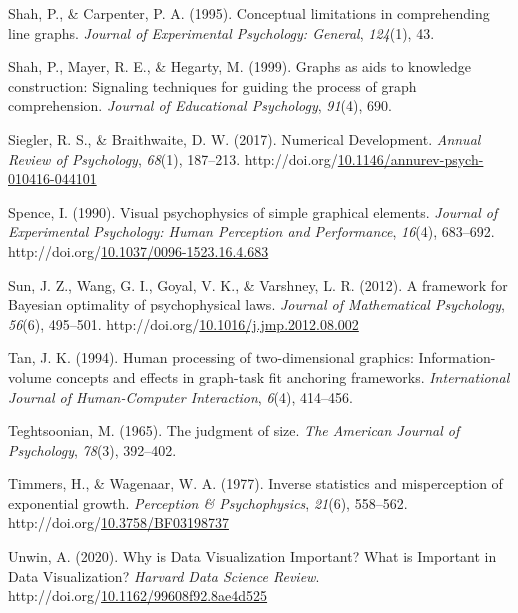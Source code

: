 \documentclass[print]{nuthesis}
\newlength{\cslhangindent}
\newenvironment{CSLReferences}%
{\setlength{\parindent}{0pt}%
\everypar{\setlength{\hangindent}{\cslhangindent}}\ignorespaces}%
{\par}
\begin{document}
\begin{CSLReferences}{1}{0}
\leavevmode\hypertarget{ref-shah1995conceptual}{}%
Shah, P., \& Carpenter, P. A. (1995). Conceptual limitations in comprehending line graphs. \emph{Journal of Experimental Psychology: General}, \emph{124}(1), 43.

\leavevmode\hypertarget{ref-shah1999graphs}{}%
Shah, P., Mayer, R. E., \& Hegarty, M. (1999). Graphs as aids to knowledge construction: Signaling techniques for guiding the process of graph comprehension. \emph{Journal of Educational Psychology}, \emph{91}(4), 690.

\leavevmode\hypertarget{ref-siegler_numerical_2017}{}%
Siegler, R. S., \& Braithwaite, D. W. (2017). Numerical {Development}. \emph{Annual Review of Psychology}, \emph{68}(1), 187--213. http://doi.org/\href{https://doi.org/10.1146/annurev-psych-010416-044101}{10.1146/annurev-psych-010416-044101}

\leavevmode\hypertarget{ref-spence_visual_1990}{}%
Spence, I. (1990). Visual psychophysics of simple graphical elements. \emph{Journal of Experimental Psychology: Human Perception and Performance}, \emph{16}(4), 683--692. http://doi.org/\href{https://doi.org/10.1037/0096-1523.16.4.683}{10.1037/0096-1523.16.4.683}

\leavevmode\hypertarget{ref-sun_framework_2012}{}%
Sun, J. Z., Wang, G. I., Goyal, V. K., \& Varshney, L. R. (2012). A framework for {Bayesian} optimality of psychophysical laws. \emph{Journal of Mathematical Psychology}, \emph{56}(6), 495--501. http://doi.org/\href{https://doi.org/10.1016/j.jmp.2012.08.002}{10.1016/j.jmp.2012.08.002}

\leavevmode\hypertarget{ref-tan1994human}{}%
Tan, J. K. (1994). Human processing of two-dimensional graphics: Information-volume concepts and effects in graph-task fit anchoring frameworks. \emph{International Journal of Human-Computer Interaction}, \emph{6}(4), 414--456.

\leavevmode\hypertarget{ref-teghtsoonian1965judgment}{}%
Teghtsoonian, M. (1965). The judgment of size. \emph{The American Journal of Psychology}, \emph{78}(3), 392--402.

\leavevmode\hypertarget{ref-timmers_inverse_1977}{}%
Timmers, H., \& Wagenaar, W. A. (1977). Inverse statistics and misperception of exponential growth. \emph{Perception \& Psychophysics}, \emph{21}(6), 558--562. http://doi.org/\href{https://doi.org/10.3758/BF03198737}{10.3758/BF03198737}

\leavevmode\hypertarget{ref-unwin_why_2020}{}%
Unwin, A. (2020). Why is {Data} {Visualization} {Important}? {What} is {Important} in {Data} {Visualization}? \emph{Harvard Data Science Review}. http://doi.org/\href{https://doi.org/10.1162/99608f92.8ae4d525}{10.1162/99608f92.8ae4d525}


\end{CSLReferences}
\end{document}

